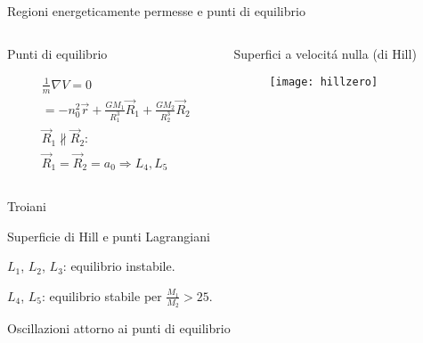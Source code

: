 \begin{frame}{Regioni energeticamente permesse e punti di equilibrio}

\begin{columns}

\begin{column}{0.43\textwidth}

\begin{block}{Punti di equilibrio}

\begin{align*}
&\frac{1}{m}\nabla V=0\\
&=-n_0^2\vec{r}+\frac{GM_1}{R_1^3}\vec{R}_1+\frac{GM_2}{R_2^3}\vec{R}_2\\
&\vec{R}_1\nparallel\vec{R}_2:\\
&\vec{R}_1=\vec{R}_2=a_0 \Rightarrow L_4, L_5
\end{align*}

\end{block}


\end{column}

\begin{column}{0.57\textwidth}

\begin{block}{Superfici a velocit\'a nulla (di Hill)}

\begin{figure}[!t]

\texttt{[image: hillzero]}

\end{figure}

\end{block}

\end{column}

\end{columns}

Troiani

\end{frame}

\begin{wordonframe}{Superficie di Hill e punti Lagrangiani}

$L_1$, $L_2$, $L_3$: equilibrio instabile.

$L_4$, $L_5$: equilibrio stabile per $\frac{M_1}{M_2}>25$.

Oscillazioni attorno ai punti di equilibrio

\end{wordonframe}

